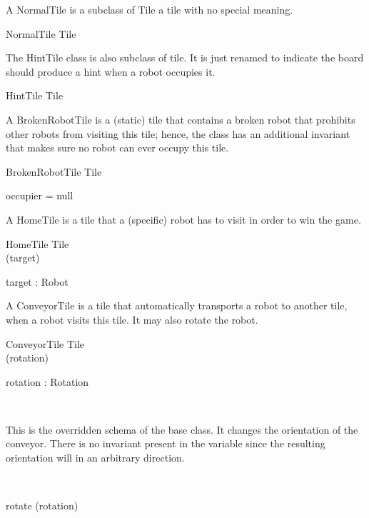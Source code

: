 A NormalTile is a subclass of Tile  a tile with no special meaning.
\begin{class}{NormalTile}
Tile
\end{class}

The HintTile class is also subclass of tile. It is just renamed to indicate the board should produce a hint when a robot occupies it.
\begin{class}{HintTile}
Tile
\end{class}

A BrokenRobotTile is a (static) tile that contains a broken robot that prohibits other robots from visiting this tile; hence, the class has an additional invariant that makes sure no robot can ever occupy this tile.
\begin{class}{BrokenRobotTile}
Tile \\
\begin{state}
\where
occupier = null
\end{state}
\end{class}

A HomeTile is a tile that a (specific) robot has to visit in order to win the game.
\begin{class}{HomeTile}
Tile \\
\upharpoonright (target) \\
\begin{state}
target : Robot
\end{state}
\end{class}

A ConveyorTile is a tile that automatically transports a robot to another tile, when a robot visits this tile. It may also rotate the robot.
\begin{class}{ConveyorTile}
Tile \\
\upharpoonright (rotation) \\
\begin{state}
rotation : Rotation
\end{state} \\
\begin{zpar}
This is the overridden schema of the base class. It changes the orientation of the conveyor. There is no invariant present in the variable since the resulting orientation will in an arbitrary direction.
\end{zpar} \\
\begin{schema}{rotate}
\Delta (rotation)
\end{schema}
\end{class}

